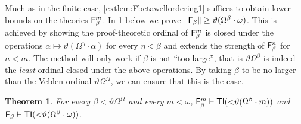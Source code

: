 \documentclass[UKenglish,cleveref,DIV=12]{scrartcl}
\newtheorem{theorem}{Theorem}
\theoremstyle{definition}
\theoremstyle{definition}
\begin{document}
Much as in the finite case, \cref{extlem:Fbetawellordering1} suffices to obtain
lower bounds on the theories $\mathsf{F}_\beta^m$. In \cref{extthm:Fbetalowerbound}
below we prove $\lVert{\mathsf{F}_\beta}\rVert\ge\vartheta(\Omega^\beta\cdot\omega)$. This is
achieved by showing the proof-theoretic ordinal of $\mathsf{F}_\beta^m$ is closed under
the operations $\alpha\mapsto\vartheta(\Omega^\eta\cdot\alpha)$ for every
$\eta<\beta$ and extends the strength of $\mathsf{F}_\beta^n$ for $n<m$. The method will
only work if $\beta$ is not ``too large'', that is $\vartheta\Omega^\beta$ is
indeed the {\em least} ordinal closed under the above operations. By taking
$\beta$ to be no larger than the Veblen ordinal $\vartheta\Omega^\Omega$,
we can ensure that this is the case. %
\begin{theorem}\label{extthm:Fbetalowerbound}
  For every $\beta<\vartheta\Omega^\Omega$ and every $m<\omega$,
  $\mathsf{F}_\beta^{m}\vdash\mathsf{TI}(\mathord<\vartheta(\Omega^\beta\cdot m))$ and $\mathsf{F}_\beta\vdash\mathsf{TI}(\mathord<\vartheta(\Omega^\beta\cdot\omega))$.
\end{theorem}
\end{document}
